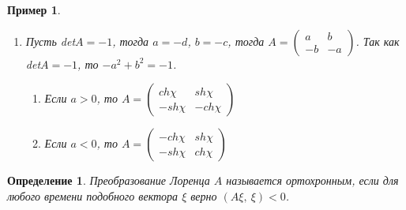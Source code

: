 \documentclass[12pt]{article}
\theoremstyle{plain}
\newtheorem{example}{Пример}
\newtheorem{definition}{Определение}[section]
\begin{document}
\begin{example}
\begin{enumerate}
\begin{enumerate}
                \item Если $a>0$, то $\begin{cases}
                    a=ch\chi\\
                    b=sh\chi
                \end{cases}$ и $A=\begin{pmatrix}
                    ch\chi & sh\chi\\
                    sh\chi & ch\chi
                \end{pmatrix}$ --- матрица гиперболического поворота. При данном повороте времени подобные векторы переходят во времени подобные.
                \item Если $a<0$, то $\begin{cases}
                    a=-ch\chi\\
                    b=-sh\chi
                \end{cases}$ и $A=\begin{pmatrix}
                    -ch\chi & -sh\chi\\
                    -sh\chi & -ch\chi
                \end{pmatrix}$
            \end{enumerate}
            \item Пусть det$A=-1$, тогда $a=-d$, $b=-c$, тогда $A=\begin{pmatrix}
                a & b\\
                -b & -a
            \end{pmatrix}$. Так как det$A=-1$, то $-a^2+b^2=-1$.
            \begin{enumerate}
                \item Если $a>0$, то $A=\begin{pmatrix}
                    ch\chi & sh\chi\\
                    -sh\chi & -ch\chi
                \end{pmatrix}$
                \item Если $a<0$, то $A=\begin{pmatrix}
                    -ch\chi & sh\chi\\
                    -sh\chi & ch\chi
                \end{pmatrix}$
            \end{enumerate}
        \end{enumerate}
    \end{example}
    \begin{definition}
        Преобразование Лоренца $A$ называется ортохронным, если для любого времени подобного вектора $\xi$ верно $(A\xi, \ \xi)<0$.
    \end{definition}
\end{document}
